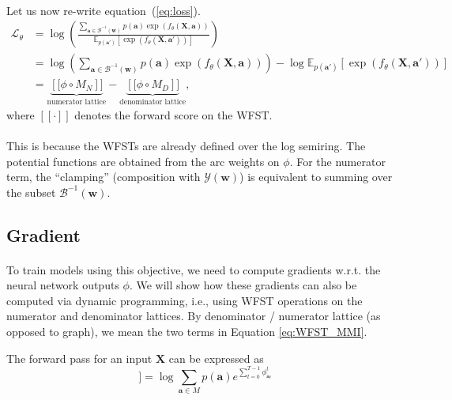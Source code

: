 \paragraph{} Let us now re-write equation~(\ref{eq:loss}).
\begin{align}
\mathcal{L}_{\theta} &= \log \left( \frac{\sum_{\mathbf{a}\in \mathcal{B}^{-1}(\mathbf{w})} p(\mathbf{a})\exp(f_{\theta}(\mathbf{X},\mathbf{a}))}{\mathbb{E}_{p(\mathbf{a'})}[\exp(f_{\theta}(\mathbf{X},\mathbf{a'}))]} \right) \\
&= \log \left( \sum_{\mathbf{a}\in \mathcal{B}^{-1}(\mathbf{w})} p(\mathbf{a})\exp(f_{\theta}(\mathbf{X},\mathbf{a})) \right) - \log \mathbb{E}_{p(\mathbf{a'})}[\exp(f_{\theta}(\mathbf{X},\mathbf{a'}))] \\
&=  \underbrace{\left[[ \phi \circ M_N \right]]}_{\text{numerator lattice}} - \underbrace{\left[[ \phi \circ M_D \right]]}_{\text{denominator lattice}}, \label{eq:WFST_MMI}
\end{align}
where $[[\cdot]]$ denotes the forward score on the WFST.

\paragraph{} This is because the WFSTs are already defined over the log semiring. The potential functions are obtained from the arc weights on $\phi$. For the numerator term, the ``clamping'' (composition with $\mathcal{Y}(\mathbf{w})$) is equivalent to summing over the subset $\mathcal{B}^{-1}(\mathbf{w})$.

\subsection{Gradient}
\paragraph{} To train models using this objective, we need to compute gradients w.r.t. the neural network outputs $\phi$. We will show how these gradients can also be computed via dynamic programming, i.e., using WFST operations on the numerator and denominator lattices. By denominator / numerator lattice (as opposed to graph), we mean the two terms in Equation \ref{eq:WFST_MMI}.

The forward pass for an input $\mathbf{X}$ can be expressed as
\begin{equation}
    [\![\phi \circ M]\!] = \log{\sum_{\mathbf{a} \in M} p\left(\mathbf{a}\right)e^{\sum_{t=0}^{T-1}\phi_{\mathbf{a}_t}^t }}
\end{equation}

